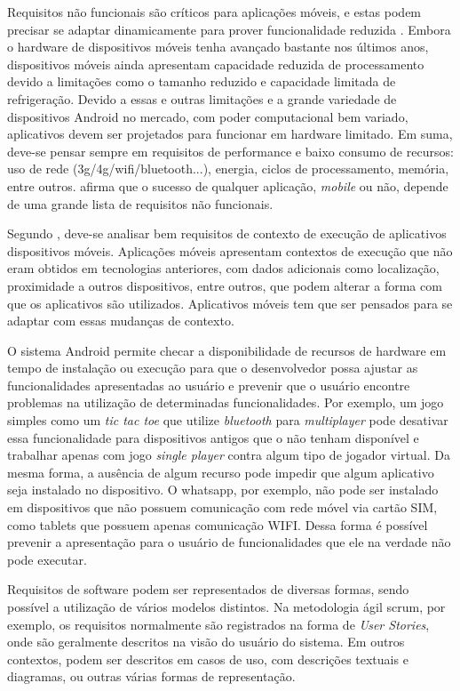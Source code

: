 Requisitos não funcionais são críticos para aplicações móveis, e estas podem precisar se adaptar dinamicamente para prover funcionalidade reduzida \cite{eswmobile}. Embora o hardware de dispositivos móveis tenha avançado bastante nos últimos anos, dispositivos móveis ainda apresentam capacidade reduzida de processamento devido a limitações como o tamanho reduzido e capacidade limitada de refrigeração. Devido a essas e outras limitações e a grande variedade de dispositivos Android no mercado, com poder computacional bem variado, aplicativos devem ser projetados para funcionar em hardware limitado. Em suma, deve-se pensar sempre em requisitos de performance e baixo consumo de recursos: uso de rede (3g/4g/wifi/bluetooth...), energia, ciclos de processamento, memória, entre outros.  afirma que o sucesso de qualquer aplicação, \textit{mobile} ou não, depende de uma grande lista de requisitos não funcionais.  

Segundo , deve-se analisar bem requisitos de contexto de execução de aplicativos dispositivos móveis. Aplicações móveis apresentam contextos de execução que não eram obtidos em tecnologias anteriores, com dados adicionais como localização, proximidade a outros dispositivos, entre outros, que podem alterar a forma com que os aplicativos são utilizados. Aplicativos móveis tem que ser pensados para se adaptar com essas mudanças de contexto.

O sistema Android permite checar a disponibilidade de recursos de hardware em tempo de instalação ou execução para que o desenvolvedor possa ajustar as funcionalidades apresentadas ao usuário e prevenir que o usuário encontre problemas na utilização de determinadas funcionalidades. Por exemplo, um jogo simples como um \textit{tic tac toe} que utilize \textit{bluetooth} para \textit{multiplayer} pode desativar essa funcionalidade para dispositivos antigos que o não tenham disponível e trabalhar apenas com jogo \textit{single player} contra algum tipo de jogador virtual. Da mesma forma, a ausência de algum recurso pode impedir que algum aplicativo seja instalado no dispositivo. O whatsapp, por exemplo, não pode ser instalado em dispositivos que não possuem comunicação com rede móvel via cartão SIM, como tablets que possuem apenas comunicação WIFI. Dessa forma é possível prevenir a apresentação para o usuário de funcionalidades que ele na verdade não pode executar.

Requisitos de software podem ser representados de diversas formas, sendo possível a utilização de vários modelos distintos. Na metodologia ágil scrum, por exemplo, os requisitos normalmente são registrados na forma de \textit{User Stories}, onde são geralmente descritos na visão do usuário do sistema. Em outros contextos, podem ser descritos em casos de uso, com descrições textuais e diagramas, ou outras várias formas de representação.

